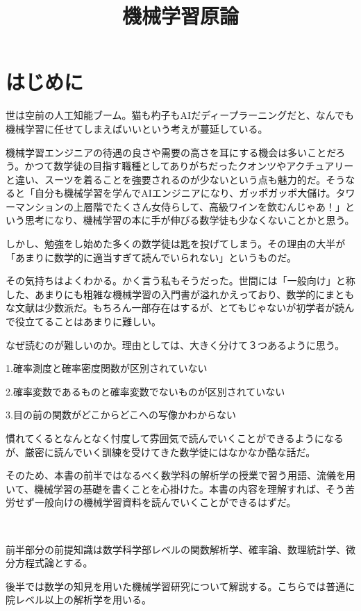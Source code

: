 \documentclass[dvipdfmx, a4paper]{jsarticle}
\title{機械学習原論}
\author{}
\begin{document}
\maketitle

\section{はじめに}
世は空前の人工知能ブーム。猫も杓子もAIだディープラーニングだと、なんでも機械学習に任せてしまえばいいという考えが蔓延している。

機械学習エンジニアの待遇の良さや需要の高さを耳にする機会は多いことだろう。かつて数学徒の目指す職種としてありがちだったクオンツやアクチュアリーと違い、スーツを着ることを強要されるのが少ないという点も魅力的だ。そうなると「自分も機械学習を学んでAIエンジニアになり、ガッポガッポ大儲け。タワーマンションの上層階でたくさん女侍らして、高級ワインを飲むんじゃあ！」という思考になり、機械学習の本に手が伸びる数学徒も少なくないことかと思う。

しかし、勉強をし始めた多くの数学徒は匙を投げてしまう。その理由の大半が「あまりに数学的に適当すぎて読んでいられない」というものだ。

その気持ちはよくわかる。かく言う私もそうだった。世間には「一般向け」と称した、あまりにも粗雑な機械学習の入門書が溢れかえっており、数学的にまともな文献は少数派だ。もちろん一部存在はするが、とてもじゃないが初学者が読んで役立てることはあまりに難しい。

なぜ読むのが難しいのか。理由としては、大きく分けて３つあるように思う。

1.確率測度と確率密度関数が区別されていない

2.確率変数であるものと確率変数でないものが区別されていない

3.目の前の関数がどこからどこへの写像かわからない

慣れてくるとなんとなく忖度して雰囲気で読んでいくことができるようになるが、厳密に読んでいく訓練を受けてきた数学徒にはなかなか酷な話だ。

そのため、本書の前半ではなるべく数学科の解析学の授業で習う用語、流儀を用いて、機械学習の基礎を書くことを心掛けた。本書の内容を理解すれば、そう苦労せず一般向けの機械学習資料を読んでいくことができるはずだ。

　

前半部分の前提知識は数学科学部レベルの関数解析学、確率論、数理統計学、微分方程式論とする。

後半では数学の知見を用いた機械学習研究について解説する。こちらでは普通に院レベル以上の解析学を用いる。
\end{document}
